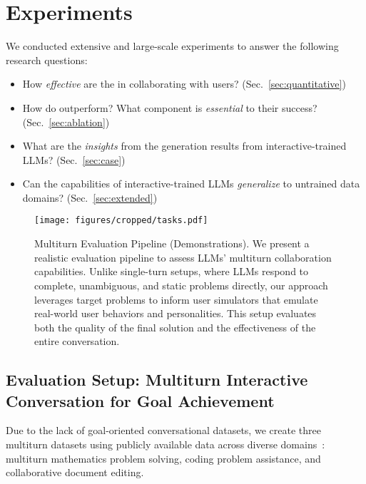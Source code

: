 \section{Experiments}
We conducted extensive and large-scale experiments to answer the following research questions:
\begin{itemize}%
    \item How \textit{effective} are the \objects in collaborating with users? (Sec.~\ref{sec:quantitative})
    \item How do \objects outperform? What component is \textit{essential} to their success? 
    (Sec.~\ref{sec:ablation})
    \item What are the \textit{insights} from the generation results from interactive-trained LLMs? (Sec.~\ref{sec:case})
    \item Can the capabilities of interactive-trained LLMs \textit{generalize} to untrained data domains? (Sec.~\ref{sec:extended})
\end{itemize}

\begin{figure*}[t]
    \centering
    \texttt{[image: figures/cropped/tasks.pdf]}
    \vspace{-10pt}
    \caption{Multiturn Evaluation Pipeline (Demonstrations).
    We present a realistic evaluation pipeline to assess LLMs' multiturn collaboration capabilities. Unlike single-turn setups, where LLMs respond to complete, unambiguous, and static problems directly, our approach leverages target problems to inform user simulators that emulate real-world user behaviors and personalities. This setup evaluates both the quality of the final solution and the effectiveness of the entire conversation.}
    \label{fig:evaluation}
\end{figure*}

\subsection{Evaluation Setup: Multiturn Interactive Conversation for Goal Achievement}

Due to the lack of goal-oriented conversational datasets, we create three multiturn datasets using publicly available data across diverse domains~\citep{math, bigcodebench, medium}: multiturn mathematics problem solving, coding problem assistance, and collaborative document editing.


